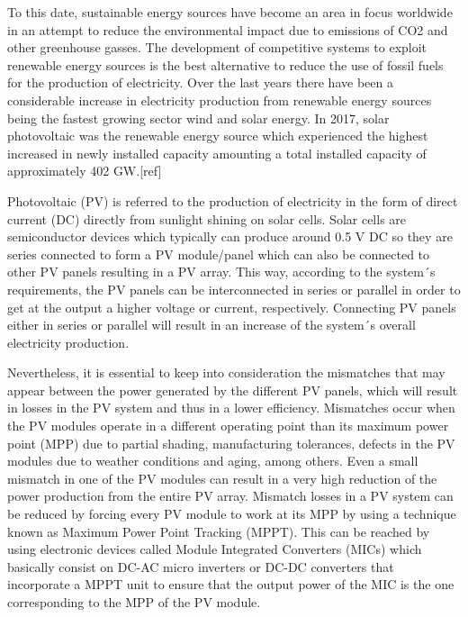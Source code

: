 
To this date, sustainable energy sources have become an area in focus worldwide in an attempt to reduce the environmental impact due to emissions of CO2 and other greenhouse gasses. The development of competitive systems to exploit renewable energy sources is the best alternative to reduce the use of fossil fuels for the production of electricity. Over the last years there have been a considerable increase in electricity production from renewable energy sources being the fastest growing sector wind and solar energy. In 2017, solar photovoltaic was the renewable energy source which experienced the highest increased in newly installed capacity amounting a total installed capacity of approximately 402 GW.[ref] %

Photovoltaic (PV) is referred to the production of electricity in the form of direct current (DC) directly from sunlight shining on solar cells. Solar cells are semiconductor devices which typically can produce around 0.5 V DC so they are series connected to form a PV module/panel which can also be connected to other PV panels resulting in a PV array. This way, according to the system´s requirements, the PV panels can be interconnected in series or parallel in order to get at the output a higher voltage or current, respectively. Connecting PV panels either in series or parallel will result in an increase of the system´s overall electricity production.  %

Nevertheless, it is essential to keep into consideration the mismatches that may appear between the power generated by the different PV panels, which will result in losses in the PV system and thus in a lower efficiency. Mismatches occur when the PV modules operate in a different operating point than its maximum power point (MPP) due to partial shading, manufacturing tolerances, defects in the PV modules due to weather conditions and aging, among others. Even a small mismatch in one of the PV modules can result in a very high reduction of the power production from the entire PV array. Mismatch losses in a PV system can be reduced by forcing every PV module to work at its MPP by using a technique known as Maximum Power Point Tracking (MPPT). This can be reached by using electronic devices called Module Integrated Converters (MICs) which basically consist on DC-AC micro inverters or DC-DC converters that incorporate a MPPT unit to ensure that the output power of the MIC is the one corresponding to the MPP of the PV module.%


